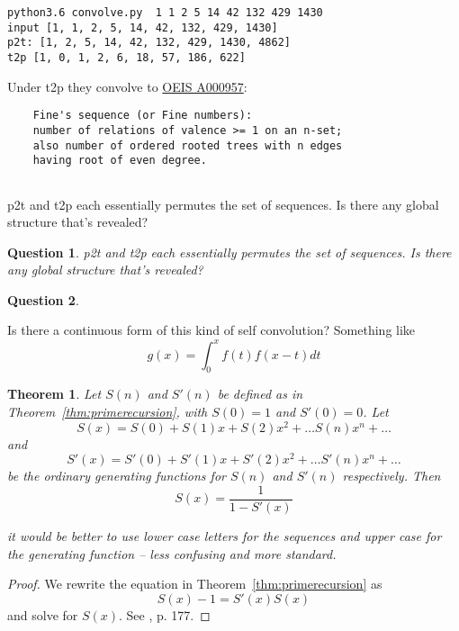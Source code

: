 \documentclass[10pt]{article}
\newtheorem{theorem}{Theorem}
\newtheorem{question}{Question}
\numberwithin{equation}{section}
\newenvironment{anote}
               {{\textcolor{blue}{Note:}}
                 \itshape
               }
               {}
\begin{document}
\begin{verbatim}
python3.6 convolve.py  1 1 2 5 14 42 132 429 1430
input [1, 1, 2, 5, 14, 42, 132, 429, 1430]
p2t: [1, 2, 5, 14, 42, 132, 429, 1430, 4862]
t2p [1, 0, 1, 2, 6, 18, 57, 186, 622]
\end{verbatim}
 Under t2p they convolve to 
\href{https://oeis.org/A000957}{OEIS A000957}:
\begin{verbatim}
	Fine's sequence (or Fine numbers):
	number of relations of valence >= 1 on an n-set;
	also number of ordered rooted trees with n edges 
	having root of even degree. 
	
\end{verbatim}
p2t and t2p each essentially permutes the set of sequences. Is there any global structure that's revealed?

\begin{question}

p2t  and  t2p  each  essentially  permutes  the  set  of  sequences.   Is  there  any global structure that’s revealed?
\end{question}
\begin{question}

\end{question}
Is there a continuous form of this kind of self convolution? Something like
\begin{equation*}
    g(x) = \int_0^x f(t)f(x-t)dt
\end{equation*}

\begin{theorem}
Let $S(n)$ and $S'(n)$ be defined as in Theorem~\ref{thm:primerecursion}, with $S(0)=1$ and $S'(0)=0$. Let 
\begin{equation*}
    S(x)=S(0)+S(1)x+S(2)x^2 + \ldots S(n)x^n + \ldots
\end{equation*}
and 
\begin{equation*}
  S'(x)=S'(0)+S'(1)x+S'(2)x^2 + \ldots S'(n)x^n + \ldots  
\end{equation*}
be the ordinary generating functions for $S(n)$ and $S'(n)$ respectively. Then 
\begin{equation*}
    S(x) = \dfrac{1}{1-S'(x)}
\end{equation*}

\begin{anote}
it would be better to use lower case letters for the sequences and upper case for the generating function -- less confusing and more standard. 
\end{anote}
\end{theorem}
\begin{proof}
We rewrite the equation in Theorem~\ref{thm:primerecursion} as 
\begin{equation*}
    S(x)-1=S'(x)S(x)
\end{equation*}
and solve for $S(x)$. See \cite{walk comb}, p. 177. 
\end{proof}
\end{document}
